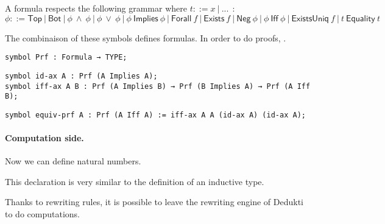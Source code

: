 \documentclass{article}
\begin{document}
	A formula respects the following grammar where $t ::= x~|~...~~$: \\
	$\phi ::= \textsf{Top}~|~\textsf{Bot}~|~\phi~\land~\phi~|~\phi~\lor~\phi~|~\phi~\textsf{Implies}~\phi~|~\textsf{Forall}~f~|~\textsf{Exists}~f~|~\textsf{Neg}~\phi~|~\phi~\textsf{Iff}~\phi~|~\textsf{ExistsUniq}~f~|~t~\textsf{Equality}~t$
	
	
	
	
	
	The combinaison of these symbols defines formulas.
	In order to do proofs, .

	\begin{lstlisting}[language=Dialekto, firstnumber=last]
symbol Prf : Formula → TYPE;
	\end{lstlisting}

	\begin{lstlisting}[language=Dialekto, firstnumber=last]
symbol id-ax A : Prf (A Implies A);
symbol iff-ax A B : Prf (A Implies B) → Prf (B Implies A) → Prf (A Iff B);
	\end{lstlisting}


	\begin{lstlisting}[language=Dialekto, firstnumber=last]
symbol equiv-prf A : Prf (A Iff A) := iff-ax A A (id-ax A) (id-ax A);
	\end{lstlisting}

\newpage
	
	\paragraph{Computation side.}
	
	Now we can define natural numbers.
	
	
	
	This declaration is very similar to the definition of an inductive type.
	
	Thanks to rewriting rules, it is possible to leave the rewriting engine of Dedukti to do computations.
	
	
	
	
\end{document}
